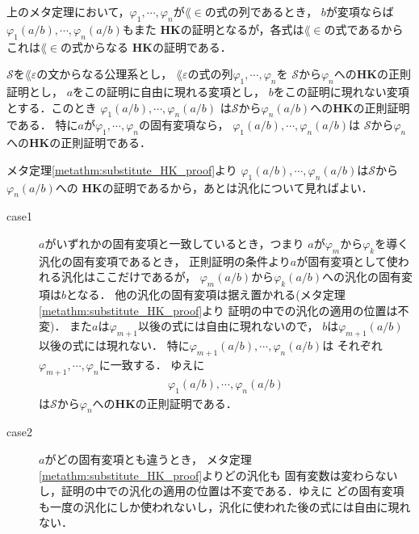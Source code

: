 	上のメタ定理において，$\varphi_{1},\cdots,\varphi_{n}$が$\lang{\in}$の式の列であるとき，
	$b$が変項ならば$\varphi_{1}(a/b),\cdots,\varphi_{n}(a/b)$もまた
	{\bf HK}の証明となるが，各式は$\lang{\in}$の式であるからこれは$\lang{\in}$の式からなる
	{\bf HK}の証明である．
	
	\begin{screen}
		\begin{metathm}[正則証明に現れる変項に代入しても正則]
		\label{metathm:substitute_regular_HK_proof}
			$\mathscr{S}$を$\lang{\varepsilon}$の文からなる公理系とし，
			$\lang{\varepsilon}$の式の列$\varphi_{1},\cdots,\varphi_{n}$を
			$\mathscr{S}$から$\varphi_{n}$への{\bf HK}の正則証明とし，
			$a$をこの証明に自由に現れる変項とし，
			$b$をこの証明に現れない変項とする．このとき
			$\varphi_{1}(a/b),\cdots,\varphi_{n}(a/b)$
			は$\mathscr{S}$から$\varphi_{n}(a/b)$への{\bf HK}の正則証明である．
			特に$a$が$\varphi_{1},\cdots,\varphi_{n}$の固有変項なら，
			$\varphi_{1}(a/b),\cdots,\varphi_{n}(a/b)$は
			$\mathscr{S}$から$\varphi_{n}$への{\bf HK}の正則証明である．
		\end{metathm}
	\end{screen}
	
	\begin{metaprf}
		メタ定理\ref{metathm:substitute_HK_proof}より
		$\varphi_{1}(a/b),\cdots,\varphi_{n}(a/b)$は$\mathscr{S}$から$\varphi_{n}(a/b)$への
		{\bf HK}の証明であるから，あとは汎化について見ればよい．
		\begin{description}
			\item[case1] $a$がいずれかの固有変項と一致しているとき，つまり
				$a$が$\varphi_{m}$から$\varphi_{k}$を導く汎化の固有変項であるとき，
				正則証明の条件より$a$が固有変項として使われる汎化はここだけであるが，
				$\varphi_{m}(a/b)$から$\varphi_{k}(a/b)$への汎化の固有変項は$b$となる．
				他の汎化の固有変項は据え置かれる(メタ定理\ref{metathm:substitute_HK_proof}より
				証明の中での汎化の適用の位置は不変)．
				また$a$は$\varphi_{m+1}$以後の式には自由に現れないので，
				$b$は$\varphi_{m+1}(a/b)$以後の式には現れない．
				特に$\varphi_{m+1}(a/b),\cdots,\varphi_{n}(a/b)$は
				それぞれ$\varphi_{m+1},\cdots,\varphi_{n}$に一致する．
				ゆえに
				\begin{align}
					\varphi_{1}(a/b),\cdots,\varphi_{n}(a/b)
				\end{align}
				は$\mathscr{S}$から$\varphi_{n}$への{\bf HK}の正則証明である．
				
			\item[case2] $a$がどの固有変項とも違うとき，
				メタ定理\ref{metathm:substitute_HK_proof}よりどの汎化も
				固有変数は変わらないし，証明の中での汎化の適用の位置は不変である．ゆえに
				どの固有変項も一度の汎化にしか使われないし，汎化に使われた後の式には自由に現れない．
				\QED
		\end{description}
	\end{metaprf}
	
